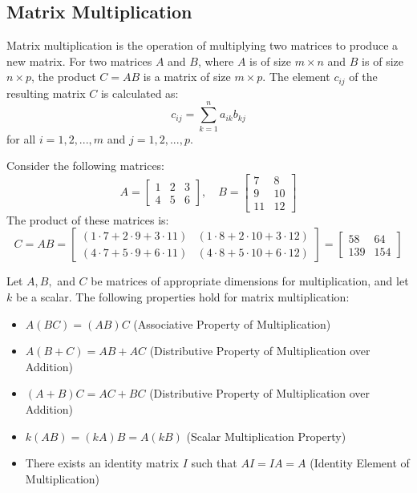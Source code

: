 \subsection{Matrix Multiplication}
\begin{definition}
    Matrix multiplication is the operation of multiplying two matrices to produce a new matrix. For two matrices \( A \) and \( B \), where \( A \) is of size \( m \times n \) and \( B \) is of size \( n \times p \), the product \( C = AB \) is a matrix of size \( m \times p \). The element \( c_{ij} \) of the resulting matrix \( C \) is calculated as:
    \[
        c_{ij} = \sum_{k=1}^{n} a_{ik} b_{kj}
    \]
    for all \( i = 1, 2, ..., m \) and \( j = 1, 2, ..., p \).
\end{definition}
\begin{eg}
    Consider the following matrices:
    \[
        A = 
        \begin{bmatrix}
            1 & 2 & 3 \\
            4 & 5 & 6
        \end{bmatrix}
        , \quad
        B = 
        \begin{bmatrix}
            7 & 8 \\
            9 & 10 \\
            11 & 12
        \end{bmatrix}
    \]
    The product of these matrices is:
    \[
        C = AB = 
        \begin{bmatrix}
            (1 \cdot 7 + 2 \cdot 9 + 3 \cdot 11) & (1 \cdot 8 + 2 \cdot 10 + 3 \cdot 12) \\
            (4 \cdot 7 + 5 \cdot 9 + 6 \cdot 11) & (4 \cdot 8 + 5 \cdot 10 + 6 \cdot 12)
        \end{bmatrix}
        =
        \begin{bmatrix}
            58 & 64 \\
            139 & 154
        \end{bmatrix}
    \]
\end{eg}
\begin{theorem}
    Let \( A, B, \) and \( C \) be matrices of appropriate dimensions for multiplication, and let \( k \) be a scalar. The following properties hold for matrix multiplication:
    \begin{itemize}[itemsep=1pt,label=$\circ$]
        \item \( A(BC) = (AB)C \) (Associative Property of Multiplication)
        \item \( A(B + C) = AB + AC \) (Distributive Property of Multiplication over Addition)
        \item \( (A + B)C = AC + BC \) (Distributive Property of Multiplication over Addition)
        \item \( k(AB) = (kA)B = A(kB) \) (Scalar Multiplication Property)
        \item There exists an identity matrix \( I \) such that \( AI = IA = A \) (Identity Element of Multiplication)
    \end{itemize}
\end{theorem}
